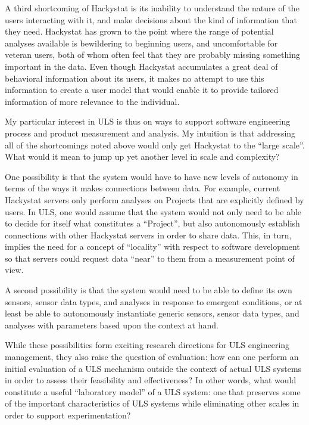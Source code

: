 \documentclass[10pt,twocolumn]{article}
\begin{document}
A third shortcoming of Hackystat is its inability to understand the nature
of the users interacting with it, and make decisions about the kind of
information that they need.  Hackystat has grown to the point where the
range of potential analyses available is bewildering to beginning users,
and uncomfortable for veteran users, both of whom often feel that they are
probably missing something important in the data.  Even though Hackystat
accumulates a great deal of behavioral information about its users, it
makes no attempt to use this information to create a user model that would
enable it to provide tailored information of more relevance to the
individual.


My particular interest in ULS is thus on ways to support software
engineering process and product measurement and analysis.  My intuition is
that addressing all of the shortcomings noted above would only get
Hackystat to the ``large scale''.  What would it mean to jump up yet
another level in scale and complexity?

One possibility is that the system would have to have new levels of
autonomy in terms of the ways it makes connections between data.  For
example, current Hackystat servers only perform analyses on Projects that
are explicitly defined by users.  In ULS, one would assume that the system
would not only need to be able to decide for itself what constitutes a
``Project'', but also autonomously establish connections with other
Hackystat servers in order to share data.  This, in turn, implies the need
for a concept of ``locality'' with respect to software development so that
servers could request data ``near'' to them from a measurement point of
view.

A second possibility is that the system would need to be able to define its
own sensors, sensor data types, and analyses in response to emergent
conditions, or at least be able to autonomously instantiate generic
sensors, sensor data types, and analyses with parameters based upon the
context at hand.  

While these possibilities form exciting research directions for ULS
engineering management, they also raise the question of evaluation: how can
one perform an initial evaluation of a ULS mechanism outside the context of
actual ULS systems in order to assess their feasibility and effectiveness? In other words, 
what would constitute a useful ``laboratory model'' of a ULS system: one that preserves
some of the important characteristics of ULS systems while eliminating other scales in 
order to support experimentation?
\end{document}
